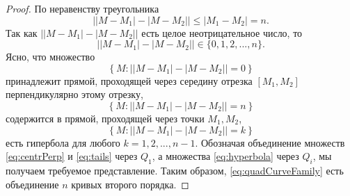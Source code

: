 \begin{proof}
	По неравенству треугольника
	\begin{equation*}
		\bigl| |M-M_1| - |M-M_2| \bigr|
		\leqslant
		|M_1 - M_2| = n
		.
	\end{equation*}
	Так как $\bigl| |M-M_1| - |M-M_2| \bigr|$
	есть целое неотрицательное число, то
	\begin{equation*}
		\bigl| |M-M_1| - |M-M_2| \bigr|
		\in\{0,1,2,...,n\}
		.
	\end{equation*}
	Ясно, что множество
	\begin{equation}
		\label{eq:centrPerp}
		\left\{ M: \bigl| |M-M_1| - |M-M_2| \bigr| = 0 \right\}
	\end{equation}
	принадлежит прямой, проходящей через середину отрезка
	$[M_1, M_2]$ перпендикулярно этому отрезку,
	\begin{equation}
		\label{eq:tails}
		\left\{ M: \bigl| |M-M_1| - |M-M_2| \bigr| = n \right\}
	\end{equation}
	содержится в прямой, проходящей через точки $M_1, M_2$,
	\begin{equation}
		\label{eq:hyperbola}
		\left\{ M: \bigl| |M-M_1| - |M-M_2| \bigr| = k \right\}
	\end{equation}
	есть гипербола для любого $k=1,2,...,n-1$.
	Обозначая объединение множеств \eqref{eq:centrPerp} и \eqref {eq:tails}
	через $Q_1$,
	а множества \eqref{eq:hyperbola} через $Q_i$,
	мы получаем требуемое представление.
	Таким образом, \eqref{eq:quadCurveFamily}
	есть объединение $n$ кривых второго порядка.
\end{proof}

